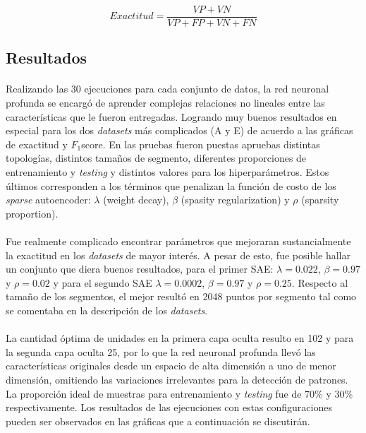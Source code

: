 \documentclass[12pt]{article}%
\begin{document}
\begin{equation}
\label{acc}
Exactitud = \frac{VP+VN}{VP+FP+VN+FN}
\end{equation} 

\subsection{Resultados}
\paragraph{}
Realizando las 30 ejecuciones para cada conjunto de datos, la red neuronal profunda se encargó de aprender complejas relaciones no lineales entre las características que le fueron entregadas. Logrando muy buenos resultados en especial para los dos \textit{datasets} más complicados (A y E) de acuerdo a las gráficas de exactitud y $F_{1}$score. En las pruebas fueron puestas apruebas distintas topologías, distintos tamaños de segmento, diferentes proporciones de entrenamiento y \textit{testing} y distintos valores para los hiperparámetros. Estos últimos corresponden a los términos que penalizan la función de costo de los \textit{sparse} autoencoder: $\lambda$ (weight decay), $\beta$ (spasity regularization) y $\rho$ (sparsity proportion).

\paragraph{}
Fue realmente complicado encontrar parámetros que mejoraran sustancialmente la exactitud en los \textit{datasets} de mayor interés. A pesar de esto, fue posible hallar un conjunto que diera buenos resultados, para el primer SAE: $\lambda=0.022$, $\beta=0.97$ y $\rho=0.02$ y para el segundo SAE $\lambda=0.0002$, $\beta=0.97$ y $\rho=0.25$. Respecto al tamaño de los segmentos, el mejor resultó en 2048 puntos por segmento tal como se comentaba en la descripción de los \textit{datasets}.

\paragraph{}
La cantidad óptima de unidades en la primera capa oculta resulto en 102 y para la segunda capa oculta 25, por lo que la red neuronal profunda llevó las características originales desde un espacio de alta dimensión a uno de menor dimensión, omitiendo las variaciones irrelevantes para la detección de patrones. La proporción ideal de muestras para entrenamiento y \textit{testing} fue de 70\% y 30\% respectivamente. Los resultados de las ejecuciones con estas configuraciones pueden ser observados en las gráficas que a continuación se discutirán.
\end{document}
